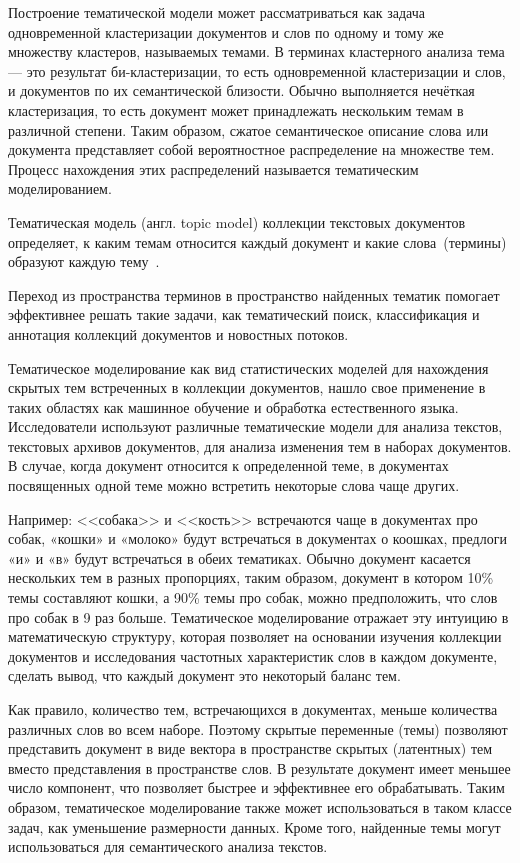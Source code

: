Построение тематической модели может рассматриваться как задача одновременной кластеризации документов и слов по одному и тому же множеству кластеров, называемых темами. В терминах кластерного анализа тема — это результат би-кластеризации, то есть одновременной кластеризации и слов, и документов по их семантической близости. Обычно выполняется нечёткая кластеризация, то есть документ может принадлежать нескольким темам в различной степени. Таким образом, сжатое семантическое описание слова или документа представляет собой вероятностное распределение на множестве тем. Процесс нахождения этих распределений называется тематическим моделированием. 

Тематическая модель (англ. topic model) коллекции текстовых документов определяет, к каким темам относится каждый документ и какие слова~(термины) образуют каждую тему~\cite{ML_PTM}. 

Переход из пространства терминов в пространство найденных тематик помогает эффективнее решать такие задачи, как тематический поиск, классификация и аннотация коллекций документов и новостных потоков.

Тематическое моделирование как вид статистических моделей для нахождения скрытых тем встреченных в коллекции документов, нашло свое применение в таких областях как машинное обучение и обработка естественного языка. Исследователи используют различные тематические модели для анализа текстов, текстовых архивов документов, для анализа изменения тем в наборах документов. В случае, когда документ относится к определенной теме, в документах посвященных одной теме можно встретить некоторые слова чаще других. 

Например: <<собака>> и <<кость>> встречаются чаще в документах про собак, «кошки» и «молоко» будут встречаться в документах о коошках, предлоги «и» и «в» будут встречаться в обеих тематиках. Обычно документ касается нескольких тем в разных пропорциях, таким образом, документ в котором 10\% темы составляют кошки, а 90\% темы про собак, можно предположить, что слов про собак в 9 раз больше. Тематическое моделирование отражает эту интуицию в математическую структуру, которая позволяет на основании изучения коллекции документов и исследования частотных характеристик слов в каждом документе, сделать вывод, что каждый документ это некоторый баланс тем.

Как правило, количество тем, встречающихся в документах, меньше количества различных слов во всем наборе. Поэтому скрытые переменные (темы) позволяют представить документ в виде вектора в пространстве скрытых (латентных) тем вместо представления в пространстве слов. В результате документ имеет меньшее число компонент, что позволяет быстрее и эффективнее его обрабатывать. Таким образом, тематическое моделирование также может использоваться в таком классе задач, как уменьшение размерности данных. Кроме того, найденные темы могут использоваться для семантического анализа текстов. 


